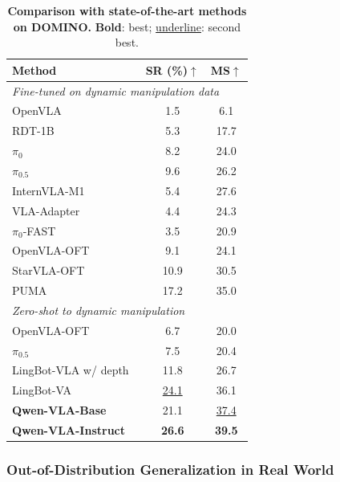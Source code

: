 \documentclass{article}
\begin{document}
\begin{table}[t]
    \centering
    \small
    \caption{\textbf{Comparison with state-of-the-art methods on DOMINO.} \textbf{Bold}: best; \underline{underline}: second best.}
    \label{tab:domino_ood}
    \setlength{\tabcolsep}{6pt}
    \begin{tabular}{lcc}
      \toprule
      \textbf{Method} & \textbf{SR (\%)$\uparrow$} & \textbf{MS$\uparrow$} \\
      \midrule
      \multicolumn{3}{l}{\textit{Fine-tuned on dynamic manipulation data}} \\
      \midrule
      OpenVLA~\citep{kim2024openvla} & 1.5  & 6.1 \\
      RDT-1B~\citep{liu2025rdt} & 5.3  & 17.7 \\
      $\pi_0$~\citep{black2024pi0} & 8.2  & 24.0 \\
      $\pi_{0.5}$~\citep{black2025pi05} & 9.6  & 26.2 \\
      InternVLA-M1~\citep{chen2025internvla} & 5.4  & 27.6 \\
      VLA-Adapter~\citep{wang2026vla} & 4.4  & 24.3 \\
      $\pi_0$-FAST~\citep{pertsch2025fast} & 3.5  & 20.9 \\
      OpenVLA-OFT~\citep{kim2025fine} & 9.1  & 24.1 \\
      StarVLA-OFT~\citep{community2026starvla} & 10.9 & 30.5 \\
      PUMA~\citep{fang2026towards} & 17.2 & 35.0 \\
      \midrule
      \multicolumn{3}{l}{\textit{Zero-shot to dynamic manipulation}} \\
      \midrule
      OpenVLA-OFT~\citep{kim2025fine} & 6.7  & 20.0 \\
      $\pi_{0.5}$~\citep{black2025pi05} & 7.5  & 20.4 \\
      LingBot-VLA w/ depth~\citep{wu2026pragmatic} & 11.8 & 26.7 \\
      LingBot-VA~\citep{li2026causal} & \underline{24.1} & 36.1 \\
      \midrule
      \textbf{Qwen-VLA-Base} & 21.1  & \underline{37.4} \\
      \textbf{Qwen-VLA-Instruct} &
      \textbf{26.6}    & \textbf{39.5} \\
      \bottomrule
    \end{tabular}
\end{table}


\subsubsection{Out-of-Distribution Generalization in Real World}

\end{document}
